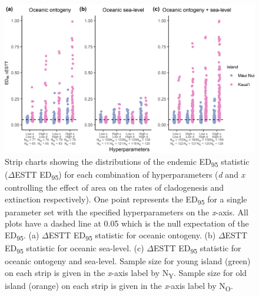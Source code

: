 \begin{figure}
    \centering
    \includegraphics{Hyperparameters_endemic.png}
    \caption{Strip charts showing the distributions of the endemic ED\textsubscript{95} statistic ($\Delta$ESTT ED\textsubscript{95}) for each combination of hyperparameters (\textit{d} and \textit{x} controlling the effect of area on the rates of cladogenesis and extinction respectively). One point represents the ED\textsubscript{95} for a single parameter set with the specified hyperparameters on the \textit{x}-axis. All plots have a dashed line at 0.05 which is the null expectation of the ED\textsubscript{95}. (a) $\Delta$ESTT ED\textsubscript{95} statistic for oceanic ontogeny. (b) $\Delta$ESTT ED\textsubscript{95} statistic for oceanic sea-level. (c) $\Delta$ESTT ED\textsubscript{95} statistic for oceanic ontogeny and sea-level. Sample size for young island (green) on each strip is given in the \textit{x}-axis label by N\textsubscript{Y}. Sample size for old island (orange) on each strip is given in the \textit{x}-axis label by N\textsubscript{O}.}
    \label{fig:Hyperparameters_endemic}
\end{figure}


